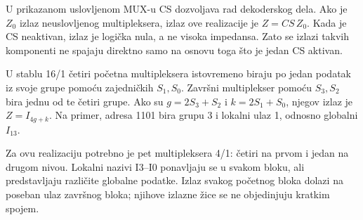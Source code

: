 
U prikazanom uslovljenom MUX-u CS dozvoljava rad dekoderskog dela. Ako je \(Z_0\) izlaz neuslovljenog multipleksera, izlaz ove realizacije je \(Z=CS\,Z_0\). Kada je CS neaktivan, izlaz je logička nula, a ne visoka impedansa. Zato se izlazi takvih komponenti ne spajaju direktno samo na osnovu toga što je jedan CS aktivan.

U stablu 16/1 četiri početna multipleksera istovremeno biraju po jedan podatak iz svoje grupe pomoću zajedničkih \(S_1,S_0\). Završni multiplekser pomoću \(S_3,S_2\) bira jednu od te četiri grupe. Ako su \(g=2S_3+S_2\) i \(k=2S_1+S_0\), njegov izlaz je \(Z=I_{4g+k}\). Na primer, adresa 1101 bira grupu 3 i lokalni ulaz 1, odnosno globalni \(I_{13}\).

Za ovu realizaciju potrebno je pet multipleksera 4/1: četiri na prvom i jedan na drugom nivou. Lokalni nazivi I3--I0 ponavljaju se u svakom bloku, ali predstavljaju različite globalne podatke. Izlaz svakog početnog bloka dolazi na poseban ulaz završnog bloka; njihove izlazne žice se ne objedinjuju kratkim spojem.
